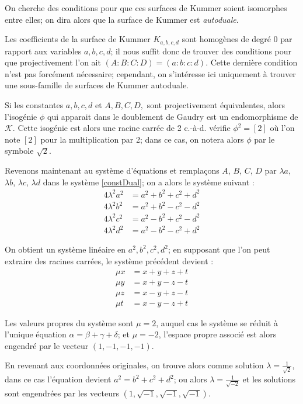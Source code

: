 \documentclass[a4paper,12pt]{article}
\theoremstyle{definition}
\theoremstyle{remark}
\numberwithin{equation}{section}
\begin{document}
On cherche des conditions pour que ces surfaces de Kummer soient isomorphes entre elles; on dira alors que la surface de Kummer est \emph{autoduale}. 

Les coefficients de la surface de Kummer $K_{a,b,c,d}$ sont homogènes de degré 0 par rapport aux variables $a,b,c,d$; il nous suffit donc de trouver des conditions pour que projectivement l'on ait $(A:B:C:D)=(a:b:c:d)$. Cette dernière condition n'est pas forcément nécessaire; cependant, on s'intéresse ici uniquement à trouver une sous-famille de surfaces de Kummer autoduale.

Si les constantes $a,b,c,d$ et $A,B,C,D,$ sont projectivement équivalentes, alors l'isogénie $\phi$ qui apparait dans le doublement de Gaudry est un endomorphisme de $\mathcal{K}$. Cette isogénie est alors une racine carrée de 2 c.-à-d. vérifie $\phi^2 = [2]$ où l'on note $[2]$ pour la multiplication par 2; dans ce cas, on notera alors $\phi$ par le symbole $\sqrt{2}$.

Revenons maintenant au système d'équations et remplaçons $A$, $B$, $C$, $D$ par $\lambda a$, $\lambda b$, $\lambda c$, $\lambda d$ dans le système \ref{constDual}; on a alors le système suivant :
\begin{align*}
4\lambda^2a^2 &= a^2 + b^2 + c^2 + d^2 \\
4\lambda^2b^2 &= a^2 + b^2 - c^2 - d^2 \\
4\lambda^2c^2 &= a^2 - b^2 + c^2 - d^2 \\
4\lambda^2d^2 &= a^2 - b^2 - c^2 + d^2
\end{align*}

On obtient un système linéaire en $a^2,b^2,c^2,d^2$; en supposant que l'on peut extraire des racines carrées, le système précédent devient :
\begin{align*}
\mu x &= x + y +  z + t \\
\mu y &= x + y -  z - t \\
\mu z &= x - y +  z - t \\
\mu t &= x - y -  z + t
\end{align*}

Les valeurs propres du système sont $\mu = 2$, auquel cas le système se réduit à l'unique équation $\alpha = \beta + \gamma + \delta$; et $\mu = -2$, l'espace propre associé est alors engendré par le vecteur $(1,-1,-1,-1)$.

En revenant aux coordonnées originales, on trouve alors comme solution $\lambda = \frac{1}{\sqrt 2}$, dans ce cas l'équation devient $a^2 = b^2 + c^2 + d^2$; ou alors $\lambda = \frac{1}{\sqrt{-2}}$ et les solutions sont engendrées par les vecteurs $(1,\sqrt{-1},\sqrt{-1},\sqrt{-1})$.
\end{document}
